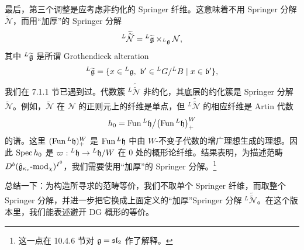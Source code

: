 最后，第三个调整是应考虑非约化的 Springer 纤维。这意味着不用 Springer 分解 $\widetilde{\mathcal{N}}$，而用“加厚”的 Springer 分解
\[
    {}^{L}\widetilde{\widetilde{\mathcal{N}}}
    ={}^{L}\widetilde{\mathfrak{g}}\times_{{}^L\mathfrak{g}}\mathcal{N},
\]
其中 ${}^L\widetilde{\mathfrak{g}}$ 是所谓 Grothendieck alteration
\[
    {}^{L}\widetilde{\fg}=\{x\in{}^L\fg,\ \mathfrak{b}'\in{}^L G/{}^L B\mid x\in\mathfrak{b}'\},
\]
我们在 7.1.1 节已遇到过。代数簇 ${}^L\widetilde{\widetilde{\mathcal{N}}}$ 非约化，其底层的约化簇是 Springer 分解 $\widetilde{\mathcal{N}}$。例如，$\widetilde{\mathcal{N}}$ 在 $\mathcal{N}$ 的正则元上的纤维是单点，但 ${}^L\widetilde{\widetilde{\mathcal{N}}}$ 的相应纤维是 Artin 代数
\[
    h_0=\operatorname{Fun}{}^L\mathfrak{h}\big/\bigl(\operatorname{Fun}{}^L\mathfrak{h}\bigr)^W_+
\]
的谱。这里 $(\operatorname{Fun}{}^L\mathfrak{h})^W_+$ 是 $\operatorname{Fun}{}^L\mathfrak{h}$ 中由 $W$-不变子代数的增广理想生成的理想。因此 $\operatorname{Spec} h_0$ 是 $\varpi:{}^L\mathfrak{h}\to{}^L\mathfrak{h}/W$ 在 $0$ 处的概形论纤维。结果表明，为描述范畴 $D^b(\hat{\mathfrak{g}}_{\kappa_c}\text{-}\mathrm{mod}_\chi)^{I^0}$，我们需要使用“加厚”的 Springer 分解。\footnote{这一点在 10.4.6 节对 $\mathfrak{g}=\mathfrak{sl}_2$ 作了解释。}

总结一下：为构造所寻求的范畴等价，我们不取单个 Springer 纤维，而取整个 Springer 分解，并进一步把它换成上面定义的“加厚”Springer 分解 ${}^L\widetilde{\widetilde{\mathcal{N}}}$。在这个版本里，我们能表述避开 DG 概形的等价。

